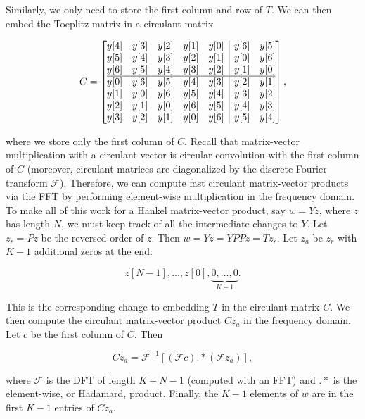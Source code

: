 \documentclass[journal]{IEEEtran}
\begin{document}
\noindent Similarly, we only need to store the first column and row of $T$.  We can then embed the Toeplitz matrix in a circulant matrix

   \[ C = \left[\begin{array}{@{}ccccc|cc@{}}
                y[4] & y[3] & y[2] & y[1] & y[0] & y[6] & y[5]\\
                y[5] & y[4] & y[3] & y[2] & y[1] & y[0] & y[6]\\
                y[6] & y[5] & y[4] & y[3] & y[2] & y[1] & y[0]\\
                \hline
                y[0] & y[6] & y[5] & y[4] & y[3] & y[2] & y[1]\\
                y[1] & y[0] & y[6] & y[5] & y[4] & y[3] & y[2]\\
                y[2] & y[1] & y[0] & y[6] & y[5] & y[4] & y[3]\\
                y[3] & y[2] & y[1] & y[0] & y[6] & y[5] & y[4]\\
                \end{array}\right], \] 

\noindent where we store only the first column of $C$.  Recall that matrix-vector multiplication with a circulant vector is circular convolution with the first column of $C$ (moreover, circulant matrices are diagonalized by the discrete Fourier transform $\mathcal{F}$).  Therefore, we can compute fast circulant matrix-vector products via the FFT by performing element-wise multiplication in the frequency domain.\\

To make all of this work for a Hankel matrix-vector product, say $w=Yz$, where $z$ has length $N$, we must keep track of all the intermediate changes to $Y$.  Let $z_r = Pz$ be the reversed order of $z$.  Then ${w=Yz=YPPz=Tz_r}$.  Let $z_a$ be $z_r$ with $K-1$ additional zeros at the end:

\[ z[N-1], ..., z[0], \underbrace{0, ..., 0}_{K-1}. \]

\noindent This is the corresponding change to embedding $T$ in the circulant matrix $C$.  We then compute the circulant matrix-vector product $Cz_a$ in the frequency domain.  Let $c$ be the first column of $C$.  Then

\[ Cz_a = \mathcal{F}^{-1}\left[\left(\mathcal{F}c\right).*\left(\mathcal{F}z_a\right)\right], \] 

\noindent where $\mathcal{F}$ is the DFT of length $K+N-1$ (computed with an FFT) and $.*$ is the element-wise, or Hadamard, product.  Finally, the $K-1$ elements of $w$ are in the first $K-1$ entries of $Cz_a$.\\
\end{document}
